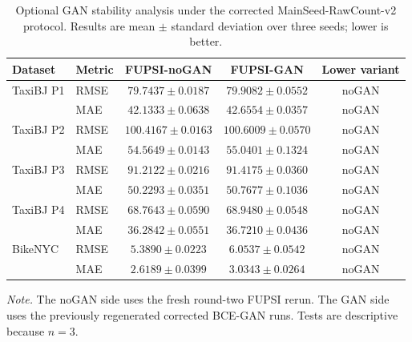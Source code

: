 \begin{table}[!htbp]
\centering
\caption{Optional GAN stability analysis under the corrected MainSeed-RawCount-v2 protocol. Results are mean $\pm$ standard deviation over three seeds; lower is better.}
\label{tab:gan-stability}
\small
\setlength{\tabcolsep}{6pt}
\begin{tabular}{llccc}
\toprule
Dataset & Metric & FUPSI-noGAN & FUPSI-GAN & Lower variant \\
\midrule
TaxiBJ P1 & RMSE & $79.7437\pm0.0187$ & $79.9082\pm0.0552$ & noGAN \\
 & MAE & $42.1333\pm0.0638$ & $42.6554\pm0.0357$ & noGAN \\
TaxiBJ P2 & RMSE & $100.4167\pm0.0163$ & $100.6009\pm0.0570$ & noGAN \\
 & MAE & $54.5649\pm0.0143$ & $55.0401\pm0.1324$ & noGAN \\
TaxiBJ P3 & RMSE & $91.2122\pm0.0216$ & $91.4175\pm0.0360$ & noGAN \\
 & MAE & $50.2293\pm0.0351$ & $50.7677\pm0.1036$ & noGAN \\
TaxiBJ P4 & RMSE & $68.7643\pm0.0590$ & $68.9480\pm0.0548$ & noGAN \\
 & MAE & $36.2842\pm0.0551$ & $36.7210\pm0.0436$ & noGAN \\
BikeNYC & RMSE & $5.3890\pm0.0223$ & $6.0537\pm0.0542$ & noGAN \\
 & MAE & $2.6189\pm0.0399$ & $3.0343\pm0.0264$ & noGAN \\
\bottomrule
\end{tabular}
\parbox{0.96\textwidth}{\footnotesize\textit{Note.} The noGAN side uses the fresh round-two FUPSI rerun. The GAN side uses the previously regenerated corrected BCE-GAN runs. Tests are descriptive because $n=3$.}
\end{table}
